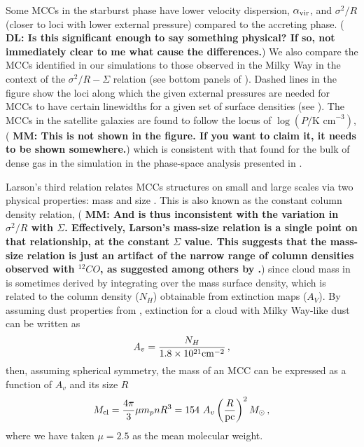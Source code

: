 \IfFileExists{emulateapjlegacy.cls}{\documentclass[iop]{emulateapjlegacy}}{\documentclass[iop]{emulateapj}}
\newcommand{\DL}[1]{({\bf \color{dlcolor} DL: #1})}
\newcommand{\MM}[1]{({\bf \color{mmcolor} MM: #1})}
\begin{document}


Some MCCs in the starburst phase have lower velocity dispersion, $\alpha_{\rm vir}$, and $\sigma^2/R$ (closer to loci with lower external pressure) compared to the accreting phase. \DL{Is this significant enough to say something physical? If so, not immediately clear to me what cause the differences.}
We also compare the MCCs identified in our simulations to those observed in the Milky Way in the context of the $\sigma^2/R - \Sigma$ relation (see bottom panels of ). Dashed lines in the figure show the loci along which the given external pressures are needed for MCCs to have certain linewidths for a given set of surface densities (see ).
The MCCs in the satellite galaxies are found to follow the locus of
$\log{(P/\textrm{K cm}^{-3})}$, \MM{This is not shown in the
  figure.  If you want to claim it, it needs to be shown somewhere.} which
is consistent with that found for the bulk of dense gas in the simulation in the phase-space analysis presented in \citet{Pallottini17a}.

Larson's third relation relates MCCs structures on small and large
scales via two physical properties: mass and size \citep{Larson81a,
  McKee07a}. This is also known as the constant column density
relation,
\MM{And is thus inconsistent with the variation in $\sigma^2/R$ with
  $\Sigma$.  Effectively, Larson's mass-size relation is a single
  point on that relationship, at the constant $\Sigma$ value.  This
  suggests that the mass-size relation is just an artifact of the
  narrow range of column densities observed with $^{12}CO$, as
  suggested among others by \citet{Ballesteros11}.}
 since cloud mass in \obs is sometimes derived by integrating over the mass surface density, which is related to the column density ($N_H$) obtainable from extinction maps ($A_V$). By assuming dust properties from \citet[][]{weingartner:2001}, extinction for a cloud with Milky Way-like dust can be written as 
\begin{equation}
A_v = \frac{N_H}{1.8 \times 10^{21} {\rm cm}^{-2}}\,,
\end{equation}
then, assuming spherical symmetry, the mass of an MCC can be expressed as a function of $A_v$ and its size $R$
\begin{equation}\label{eqn:constantcolumndensity}
M_{\rm cl} = \frac{4\pi}{3} \mu m_p n R^3 = 154~A_v \left(\frac{R}{\rm pc}\right)^2 \Msun \,,
\end{equation}
where we have taken $\mu = 2.5$ as the mean molecular weight.  
\end{document}
